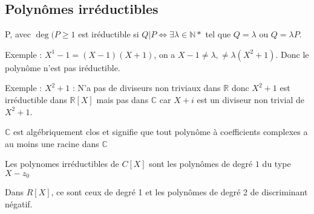 \documentclass[french]{yLectureNote}
\begin{document}
\subsection{Polyn\^omes irréductibles}
\begin{definition}
P, avec $\deg(P\geq 1$ est iréductible si $Q|P \iff \exists \lambda \in\mathbb{N} *$ tel que $Q=\lambda$ ou $Q=\lambda P$.
\end{definition}
Exemple : $X^1-1 = (X-1)(X+1)$, on a $X-1\neq \lambda, \neq \lambda(X^2+1)$. Donc le polyn\^ome n'est pas iréductible.

Exemple : $X^2+1$ : N'a pas de diviseurs non triviaux dans $\mathbb{R}$ donc $X^2+1$ est irréductible dans $\mathbb{R}[X]$ mais pas dans $\mathbb{C}$ car $X+i$ est un diviseur non trivial de $X^2+1$.
\begin{theorem}
 $\mathbb{C}$ est algébriquement clos et signifie que tout polyn\^ome à coefficients complexes a au moins une racine dans $\mathbb{C}$
\end{theorem}
\begin{theorem}
 Les polynomes irréductibles de $C[X]$ sont les polyn\^omes de degré $1$ du type $X-z_0$

 Dans $R[X]$, ce sont ceux de degré 1 et les polyn\^omes de degré 2 de discriminant négatif.
\end{theorem}
\end{document}
